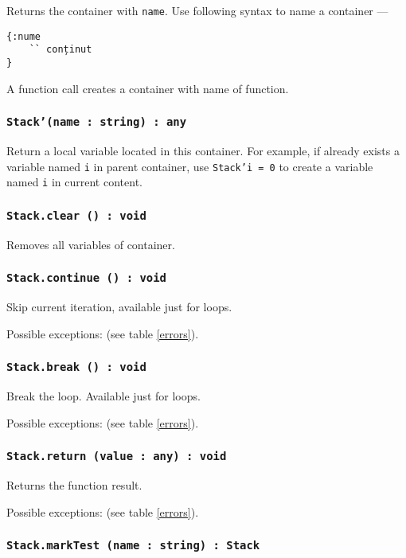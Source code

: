 Returns the container with \texttt{name}. Use following syntax to name a container —
\begin{verbatim}
{:nume
	`` conținut
}
\end{verbatim}
A function call creates a container with name of function.


\subsubsection{\texttt{Stack'(name : string) : any}}

Return a local variable located in this container. For example, if already exists a variable named \texttt{i} in parent container, use \texttt{Stack'i = 0} to create a variable named \texttt{i} in current content.

\subsubsection{\texttt{Stack.clear () : void}}

Removes all variables of container.

\subsubsection{\texttt{Stack.continue () : void}}

Skip current iteration, available just for loops.

Possible exceptions:  (see table \ref{errors}).

\subsubsection{\texttt{Stack.break () : void}}

Break the loop. Available just for loops.

Possible exceptions:  (see table \ref{errors}).

\subsubsection{\texttt{Stack.return (value : any) : void}}

Returns the function result.

Possible exceptions:  (see table \ref{errors}).

\subsubsection{\texttt{Stack.markTest (name : string) : Stack}}

